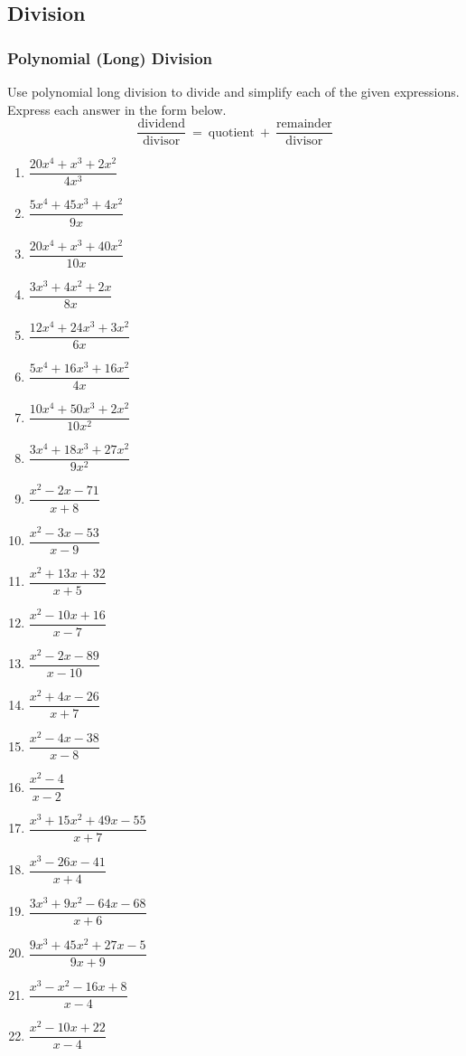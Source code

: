 \documentclass[12pt]{book}
\theoremstyle{definition}
\begin{document}
\subsection*{Division}
\subsubsection{Polynomial (Long) Division}
Use polynomial long division to divide and simplify each of the given expressions.  Express each answer in the form below.
$$\frac{\text{dividend}}{\text{divisor}} \ = \ \text{quotient} \ + \ \frac{\text{remainder}}{\text{divisor}}$$
\begin{multicols}{3}
\begin{enumerate}
  \item $\dfrac{20 x^4 + x^3 + 2 x^2}{4 x^3}$
  \item $\dfrac{5 x^4 + 45 x^3 + 4 x^2}{9 x}$
  \item $\dfrac{20 x^4 + x^3 + 40 x^2}{10 x}$
  \item $\dfrac{3 x^3 + 4 x^2 + 2 x}{8 x}$
  \item $\dfrac{12 x^4 + 24 x^3 + 3 x^2}{6 x}$
  \item $\dfrac{5 x^4 + 16 x^3 + 16 x^2}{4 x}$
  \item $\dfrac{10 x^4 + 50 x^3 + 2 x^2}{10 x^2}$
  \item $\dfrac{3 x^4 + 18 x^3 + 27 x^2}{9 x^2}$
  \item $\dfrac{x^2 - 2 x - 71}{x + 8}$\label{polydiv_one}
  \item $\dfrac{x^2 - 3 x - 53}{x - 9}$
  \item $\dfrac{x^2 + 13 x + 32}{x + 5}$
  \item $\dfrac{x^2 - 10 x + 16}{x - 7}$
  \item $\dfrac{x^2 - 2 x - 89}{x - 10}$
  \item $\dfrac{x^2 + 4 x - 26}{x + 7}$
  \item $\dfrac{x^2 - 4 x - 38}{x - 8}$
  \item $\dfrac{x^2 - 4}{x - 2}$
  \item $\dfrac{x^3 + 15 x^2 + 49 x - 55}{x + 7}$
  \item $\dfrac{x^3 - 26 x - 41}{x + 4}$
  \item $\dfrac{3 x^3 + 9 x^2 - 64 x - 68}{x + 6}$
  \item $\dfrac{9 x^3 + 45 x^2 + 27 x - 5}{9 x + 9}$
  \item $\dfrac{x^3 - x^2 - 16 x + 8}{x - 4}$
  \item $\dfrac{x^2 - 10 x + 22}{x - 4}$

\end{enumerate}
\end{multicols}
\end{document}

